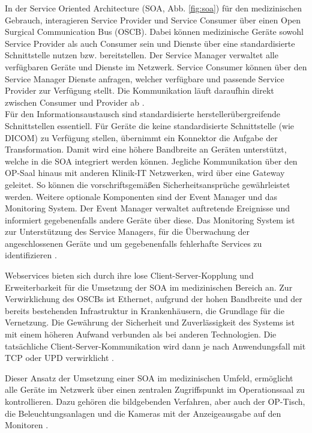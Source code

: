 In der Service Oriented Architecture (SOA, Abb. \ref{fig:soa}) für den medizinischen Gebrauch, interagieren Service Provider und Service Consumer über einen Open Surgical Communication Bus (OSCB). Dabei können medizinische Geräte sowohl Service Provider als auch Consumer sein und Dienste über eine standardisierte Schnittstelle nutzen bzw. bereitstellen. Der Service Manager verwaltet alle verfügbaren Geräte und Dienste im Netzwerk. Service Consumer können über den Service Manager Dienste anfragen, welcher verfügbare und passende Service Provider zur Verfügung stellt. Die Kommunikation läuft daraufhin direkt zwischen Consumer und Provider ab \cite{DerDigitaleOperationssaal}. \\ 
Für den Informationsaustausch sind standardisierte herstellerübergreifende Schnittstellen essentiell. Für Geräte die keine standardisierte Schnittstelle (wie DICOM) zu Verfügung stellen, übernimmt ein Konnektor die Aufgabe der Transformation. Damit wird eine höhere Bandbreite an Geräten unterstützt, welche in die SOA integriert werden können. Jegliche Kommunikation über den OP-Saal hinaus mit anderen Klinik-IT Netzwerken, wird über eine Gateway geleitet. So können die vorschriftsgemäßen Sicherheitsansprüche gewährleistet werden. Weitere optionale Komponenten sind der Event Manager und das Monitoring System. Der Event Manager verwaltet auftretende Ereignisse und informiert gegebenenfalls andere Geräte über diese. Das Monitoring System ist zur Unterstützung des Service Managers, für die Überwachung der angeschlossenen Geräte und um gegebenenfalls fehlerhafte Services zu identifizieren \cite{DerDigitaleOperationssaal}. 

Webservices bieten sich durch ihre lose Client-Server-Kopplung und Erweiterbarkeit für die Umsetzung der SOA im medizinischen Bereich an. Zur Verwirklichung des OSCBs ist Ethernet, aufgrund der hohen Bandbreite und der bereits bestehenden Infrastruktur in Krankenhäusern, die Grundlage für die Vernetzung. Die Gewährung der Sicherheit und Zuverlässigkeit des Systems ist mit einem höheren Aufwand verbunden als bei anderen Technologien. Die tatsächliche Client-Server-Kommunikation wird dann je nach Anwendungsfall mit TCP oder UPD verwirklicht \cite{DerDigitaleOperationssaal}.

Dieser Ansatz der Umsetzung einer SOA im medizinischen Umfeld, ermöglicht alle Geräte im Netzwerk über einen zentralen Zugriffspunkt im Operationssaal zu kontrollieren. Dazu gehören die bildgebenden Verfahren, aber auch der OP-Tisch, die Beleuchtungsanlagen und die Kameras mit der Anzeigeausgabe auf den Monitoren \cite{DerDigitaleOperationssaal}.

